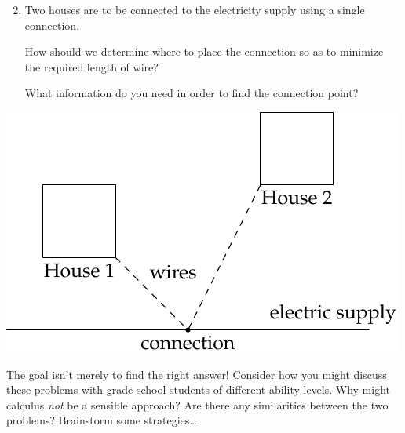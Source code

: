 \begin{minipage}[t]{0.51\linewidth}\vspace{0pt}
	\begin{enumerate}\setcounter{enumi}{1}
	  \item Two houses are to be connected to the electricity supply using a single connection.\par
	  How should we determine where to place the connection so as to minimize the required length of wire?\par
	  What information do you need in order to find the connection point?
	\end{enumerate}
\end{minipage}
\hfill
\begin{minipage}[t]{0.48\linewidth}\vspace{0pt}
	\flushright
	\includegraphics[scale=0.9]{intro-elec}
\end{minipage}
\medbreak


The goal isn't merely to find the right answer! Consider how you might discuss these problems with grade-school students of different ability levels. Why might calculus \emph{not} be a sensible approach? Are there any similarities between the two problems? Brainstorm some strategies\ldots


\goodbreak



